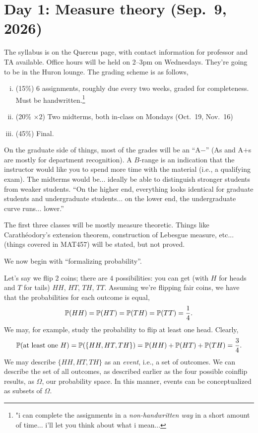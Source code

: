 \section{Day 1: Measure theory (Sep.\ 9, 2026)}
The syllabus is on the Quercus page, with contact information for professor and TA available. Office hours will be held on 2--3pm on Wednesdays. They're going to be in the Huron lounge. The grading scheme is as follows,
\begin{enumerate}[(i)]
    \item (15\%) 6 assignments, roughly due every two weeks, graded for completeness. Must be handwritten.\footnote{"i can complete the assignments in a \textit{non-handwritten way} in a short amount of time... i'll let you think about what i mean...}
    \item (20\% $\times 2$) Two midterms, both in-class on Mondays (Oct.\ 19, Nov.\ 16)
    \item (45\%) Final.
\end{enumerate}
On the graduate side of things, most of the grades will be an ``A$-$'' (As and A$+$s are mostly for department recognition). A $B$-range is an indication that the instructor would like you to spend more time with the material (i.e., a qualifying exam). The midterms would be... ideally be able to distinguish stronger students from weaker students. ``On the higher end, everything looks identical for graduate students and undergraduate students... on the lower end, the undergraduate curve runs... lower.''

The first three classes will be mostly measure theoretic. Things like Carath\'eodory's extension theorem, construction of Lebesgue measure, etc... (things covered in MAT457) will be stated, but not proved.

We now begin with ``formalizing probability''.
\begin{example}[Coinflips]
    Let's say we flip $2$ coins; there are $4$ possibilities: you can get (with $H$ for heads and $T$ for tails) $HH$, $HT$, $TH$, $TT$. Assuming we're flipping fair coins, we have that the probabilities for each outcome is equal,
    \[ \mathbb P(HH) = \mathbb P(HT) = \mathbb P(TH) = \mathbb P(TT) = \frac{1}{4}. \]
    We may, for example, study the probability to flip at least one head. Clearly,
    \[ \mathbb P(\text{at least one } H) = \mathbb P(\{HH, HT, TH\}) = \mathbb P(HH) + \mathbb P(HT) + \mathbb P(TH) = \frac{3}{4}. \]
    We may describe $\{HH, HT, TH\}$ as an \textit{event}, i.e., a set of outcomes. We can describe the set of all outcomes, as described earlier as the four possible coinflip results, as $\Omega$, our probability space. In this manner, events can be conceptualized as subsets of $\Omega$.
\end{example}

